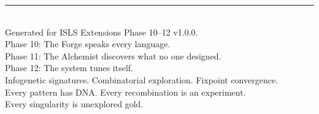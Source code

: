 \documentclass[11pt,a4paper,twoside]{article}
\theoremstyle{definition}
\theoremstyle{plain}
\theoremstyle{remark}
\newcommand{\ISLS}{\textsf{ISLS}}
\begin{document}
\vfill
\begin{center}
\rule{0.5\textwidth}{0.4pt}\\[0.5cm]
{\small Generated for \ISLS{} Extensions Phase 10--12 v1.0.0.\\[0.2cm]
Phase 10: The Forge speaks every language.\\
Phase 11: The Alchemist discovers what no one designed.\\
Phase 12: The system tunes itself.\\[0.3cm]
Infogenetic signatures. Combinatorial exploration. Fixpoint convergence.\\
Every pattern has DNA. Every recombination is an experiment.\\
Every singularity is unexplored gold.}
\end{center}
\end{document}
